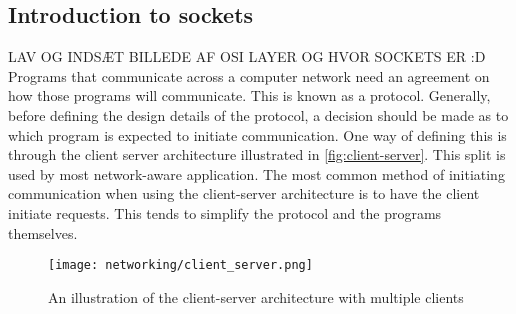 \subsection{Introduction to sockets}
LAV OG INDSÆT BILLEDE AF OSI LAYER OG HVOR SOCKETS ER :D
Programs that communicate across a computer network need an agreement on how those programs will communicate.
This is known as a protocol.
Generally, before defining the design details of the protocol, a decision should be made as to which program is expected to initiate communication.
One way of defining this is through the client server architecture illustrated in \autoref{fig:client-server}.
This split is used by most network-aware application\cite{socketnetworking}.
The most common method of initiating communication when using the client-server architecture is to have the client initiate requests.
This tends to simplify the protocol and the programs themselves\cite{socketnetworking}.



\begin{figure}[H]
    \centering
    \texttt{[image: networking/client\_server.png]}
    \caption{An illustration of the client-server architecture with multiple clients}
    \label{fig:client-server}
\end{figure}

